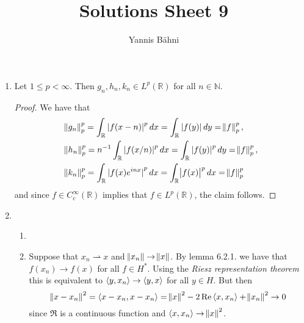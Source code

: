 

\title{Solutions Sheet 9}
\author{Yannis B\"{a}hni}
\address[Yannis B\"{a}hni]{University of Zurich, R\"{a}mistrasse 71, 8006 Zurich}



\maketitle
\thispagestyle{fancy}

\setcounter{section}{1}

\begin{enumerate}[label = \textbf{Exercise \arabic*.},wide = 0pt, itemsep = 1.5ex]
	\item 
		\begin{lemma}
			Let $1 \leq p < \infty$. Then $g_n,h_n,k_n \in L^p(\mathbb{R})$ for all $n \in \mathbb{N}$.	
		\end{lemma}

		\begin{proof}
			We have that 
			\begin{align*}
				&\norm{g_n}_p^p = \int_\mathbb{R} \abs[0]{f(x - n)}^p dx = \int_\mathbb{R} \abs[0]{f(y)} dy = \norm{f}_p^p,\\
				&\norm{h_n}_p^p = n^{-1}\int_\mathbb{R} \abs[0]{f(x/n)}^p dx = \int_\mathbb{R} \abs[0]{f(y)}^p dy = \norm{f}_p^p,\\
				&\norm{k_n}_p^p = \int_\mathbb{R} \abs[0]{f(x) e^{inx}}^p dx = \int_\mathbb{R} \abs{f(x)}^p dx = \norm{f}_p^p 
			\end{align*}
			\noindent and since $f \in C_c^\infty(\mathbb{R})$ implies that $f \in L^p(\mathbb{R})$, the claim follows.
		\end{proof}
	\item
		~
		\begin{enumerate}[label = \textbf{\alph*.},wide = 0pt, itemsep = 1.5ex]
			\item 
			\item Suppose that $x_n \rightharpoonup x$ and $\norm{x_n} \to \norm{x}$. By lemma 6.2.1. we have that $f(x_n) \to f(x)$ for all $f \in H^*$. Using the \emph{Riesz representation theorem} this is equivalent to $\inprod{y}{x_n} \to \inprod{y}{x}$ for all $y \in H$. But then
				\begin{equation*}
					\norm{x - x_n}^2 = \inprod{x - x_n}{x - x_n} = \norm{x}^2 - 2\Re\inprod{x}{x_n} + \norm{x_n}^2 \to 0
				\end{equation*}
				\noindent since $\Re$ is a continuous function and $\inprod{x}{x_n} \to \norm{x}^2$.
		\end{enumerate}


\end{enumerate}
